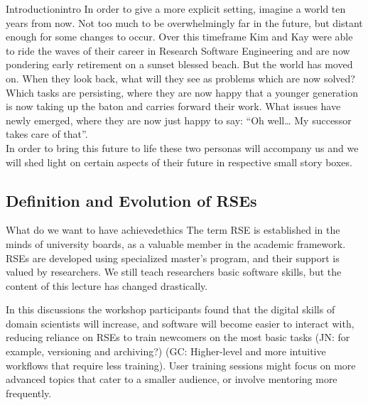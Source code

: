 \documentclass{eceasst}
\begin{document}
\begin{story}{Introduction}{intro}
In order to give a more explicit setting, imagine a world ten years from now.
Not too much to be overwhelmingly far in the future, but distant enough for some changes to occur.
Over this timeframe Kim\cite{Anzt2021} and Kay\cite{Goth2024}
were able to ride the waves of their career in Research Software Engineering and are now pondering early retirement on a sunset blessed beach.
But the world has moved on.
When they look back, what will they see as problems which are now solved?
Which tasks are persisting, where they are now happy that a younger generation is now taking up the baton and carries forward their work.
What issues have newly emerged, where they are now just happy to say: “Oh well… My successor takes care of that”.\\
In order to bring this future to life these two personas will accompany us and we will shed light on certain aspects
of their future in respective small story boxes.
 \end{story}


\subsection{Definition and Evolution of RSEs}
\begin{whatis}{What do we want to have achieved}{ethics}
The term RSE is established in the minds of university boards, as a valuable member in the academic framework.
RSEs are developed using specialized master's program, and their support is valued by researchers. We still teach researchers basic software skills, but the content of this lecture has changed drastically.
\end{whatis}
In this discussions the workshop participants found that
the digital skills of domain scientists will increase,
and software will become easier to interact with,
reducing reliance on RSEs to train newcomers on the most basic tasks
(JN: for example, versioning and archiving?)
(GC: Higher-level and more intuitive workflows that require less training).
User training sessions might focus on more advanced topics
that cater to a smaller audience, or involve mentoring more frequently.
\end{document}
